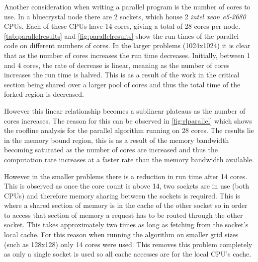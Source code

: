 \documentclass{article}
\begin{document}
\begin{multicols}{2}
Another consideration when writing a parallel program is the number of cores
to use. In a bluecrystal node there are 2 sockets, which house 2 \emph{intel
xeon e5-2680} CPUs. Each of these CPUs have 14 cores, giving a total of 28
cores per node. \autoref{tab:parallelresults} and \autoref{fig:parallelresults}
show the run times of the parallel code on different numbers of cores. In the
larger problems (1024x1024) it is clear that as the number of cores increases
the run time decreases. Initially, between 1 and 4 cores, the rate of decrease
is linear, meaning as the number of cores increases the run time is halved.
This is as a result of the work in the critical section being shared over a
larger pool of cores and thus the total time of the forked region is decreased.

However this linear relationship becomes a sublinear plateaus as the number of
cores increases. The reason for this can be observed in
\autoref{fig:rlparallel} which shows the roofline analysis for the parallel
algorithm running on 28 cores. The results lie in the memory bound region,
this is as a result of the memory bandwidth becoming saturated as the number of
cores are increased and thus the computation rate increases at a faster rate
than the memory bandwidth available. 

However in the smaller problems there is a reduction in run time after 14
cores. This is observed as once the core count is above 14, two sockets are in
use (both CPUs) and therefore memory sharing between the sockets is required.
This is where a shared section of memory is in the cache of the other
socket so in order to access that section of memory a request has to be routed
through the other socket. This takes approximately two times as long as
fetching from the socket's local cache. For this reason when running the
algorithm on smaller grid sizes (such as 128x128) only 14 cores were used. This
removes this problem completely as only a single socket is used so all cache
accesses are for the local CPU's cache.


\end{multicols}
\end{document}
